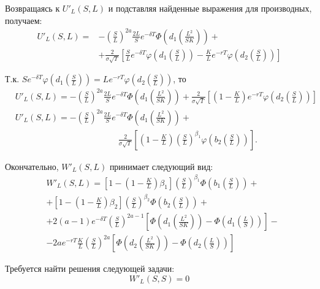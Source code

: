 \documentclass[oneside,final,12pt]{article}
\begin{document}
Возвращаясь к $U'_L(S,L)$ и подставляя найденные выражения для производных, получаем:
\begin{align*}
    U'_L(S,L) = & - \left( \frac{S}{L} \right)^{2a} \frac{2L}{S}e^{-\delta T} \Phi \left( d_1\left( \frac{L^2}{SK}\right)\right) + \\
    & + \frac{2}{\sigma \sqrt{T}} \left[ \frac{S}{L}e^{-\delta T} \varphi \left( d_1\left( \frac{S}{L}\right)\right) - \frac{K}{L} e^{-rT} \varphi \left( d_2\left( \frac{S}{L}\right)\right)\right] 
\end{align*}

Т.к. $Se^{-\delta T} \varphi \left( d_1\left( \frac{S}{L}\right)\right) = 
Le^{-rT} \varphi \left( d_2\left( \frac{S}{L}\right)\right)$, то
\begin{align*}
    & U'_L(S,L) = - \left( \frac{S}{L} \right)^{2a} \frac{2L}{S}e^{-\delta T} \Phi \left( d_1\left( \frac{L^2}{SK}\right)\right) + \frac{2}{\sigma \sqrt{T}} \left[ \left( 1-\frac{K}{L}\right) e^{-rT} \varphi \left( d_2\left( \frac{S}{L}\right)\right)\right] \\
    & U'_L(S,L) = - \left( \frac{S}{L} \right)^{2a} \frac{2L}{S}e^{-\delta T} \Phi \left( d_1\left( \frac{L^2}{SK}\right)\right) + \\ 
    & \qquad \qquad \qquad \qquad \qquad \qquad
    \frac{2}{\sigma \sqrt{T}} \left[ \left( 1-\frac{K}{L}\right) \left( \frac{S}{L} \right)^{\beta_1} \varphi \left( b_2\left( \frac{S}{L}\right)\right)\right].
\end{align*}

Окончательно, $W'_L(S,L)$ принимает следующий вид:
\begin{align*}
    & W'_L(S,L) = \left[ 1 - \left(1-\frac{K}{L} \right)\beta_1 \right] \left( \frac{S}{L} \right)^{\beta_1} \Phi\left(b_1\left(\frac{S}{L}\right)\right) + \\
    & + \left[ 1 - \left(1-\frac{K}{L} \right)\beta_2 \right] \left( \frac{S}{L} \right)^{\beta_2} \Phi\left(b_2\left(\frac{S}{L}\right)\right) + \\
    & + 2(a-1)e^{-\delta T} \left(\frac{S}{L}\right)^{2a-1} \left[ \Phi\left(d_1\left(\frac{L^2}{SK}\right)\right) - \Phi\left(d_1\left(\frac{L}{S}\right)\right) \right] - \\
    & - 2ae^{-rT}\frac{K}{L}\left(\frac{S}{L}\right)^{2a} \left[ \Phi\left(d_2\left(\frac{L^2}{SK}\right)\right) - \Phi\left(d_2\left(\frac{L}{S}\right)\right) \right]
\end{align*}

Требуется найти решения следующей задачи:
$$ W'_L(S,S)=0$$
\end{document}
